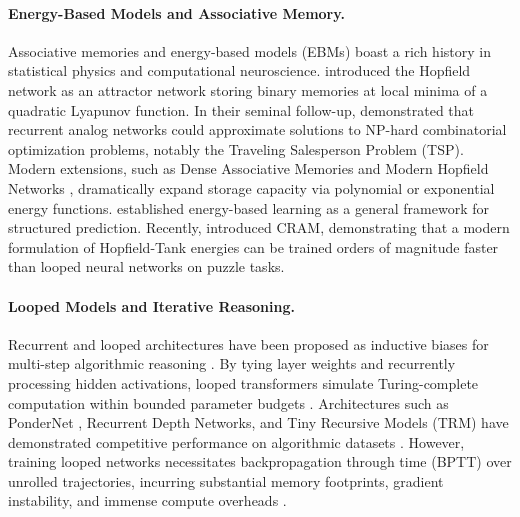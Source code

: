 \documentclass{article} %
\begin{document}
\paragraph{Energy-Based Models and Associative Memory.}
Associative memories and energy-based models (EBMs) boast a rich history in statistical physics and computational neuroscience. \citet{hopfield1982neural} introduced the Hopfield network as an attractor network storing binary memories at local minima of a quadratic Lyapunov function. In their seminal follow-up, \citet{hopfield1985neural} demonstrated that recurrent analog networks could approximate solutions to NP-hard combinatorial optimization problems, notably the Traveling Salesperson Problem (TSP). Modern extensions, such as Dense Associative Memories \citep{krotov2016dense} and Modern Hopfield Networks \citep{demircigil2017model, ramsauer2020hopfield}, dramatically expand storage capacity via polynomial or exponential energy functions. \citet{lecun2006tutorial} established energy-based learning as a general framework for structured prediction. Recently, \citet{hoover2026cram} introduced CRAM, demonstrating that a modern formulation of Hopfield-Tank energies can be trained orders of magnitude faster than looped neural networks on puzzle tasks.

\paragraph{Looped Models and Iterative Reasoning.}
Recurrent and looped architectures have been proposed as inductive biases for multi-step algorithmic reasoning \citep{dehghani2018universal}. By tying layer weights and recurrently processing hidden activations, looped transformers simulate Turing-complete computation within bounded parameter budgets \citep{giannou2023looped, perez2019turing}. Architectures such as PonderNet \citep{banino2021pico}, Recurrent Depth Networks, and Tiny Recursive Models (TRM) have demonstrated competitive performance on algorithmic datasets \citep{arora2024looped}. However, training looped networks necessitates backpropagation through time (BPTT) over unrolled trajectories, incurring substantial memory footprints, gradient instability, and immense compute overheads \citep{hoover2026cram}.
\end{document}
